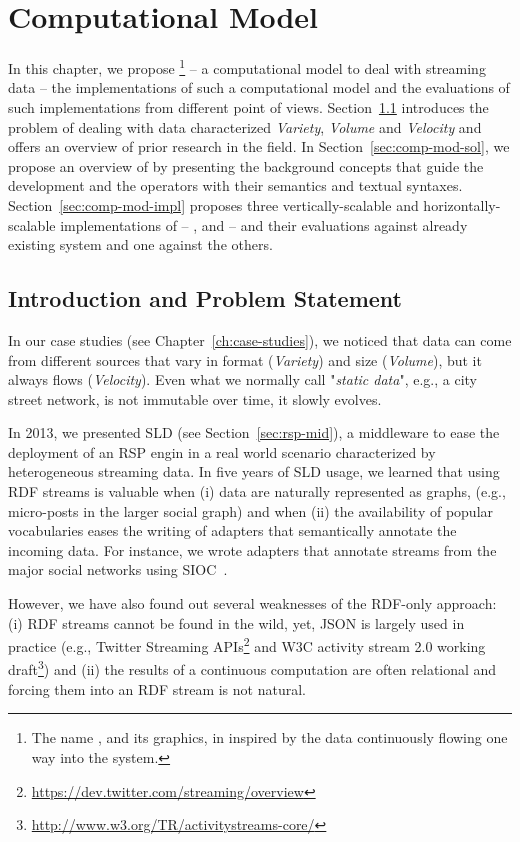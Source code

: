 \chapter{Computational Model}\label{ch:computational}
In this chapter, we propose \river{}\footnote{The name \river, and its graphics, in inspired by the data continuously flowing one way into the system.} -- a computational model to deal with streaming data -- the implementations of such a computational model and the evaluations of such implementations from different point of views.
Section~\ref{sec:comp-mod-intro} introduces the problem of dealing with data characterized \textit{Variety}, \textit{Volume} and \textit{Velocity} and offers an overview of prior research in the field.
In Section~\ref{sec:comp-mod-sol}, we propose an overview of \river{} by presenting the background concepts that guide the development and the operators with their semantics and textual syntaxes.
Section~\ref{sec:comp-mod-impl} proposes three vertically-scalable and horizontally-scalable implementations of \river{} -- \sti{}, \sparkdi{} and \hivedi{} -- and their evaluations against already existing system and one against the others.

\section{Introduction and Problem Statement} \label{sec:comp-mod-intro}
In our case studies (see Chapter~\ref{ch:case-studies}), we noticed that data can come from different sources that vary in format (\textit{Variety}) and size (\textit{Volume}), but it  always flows (\textit{Velocity}). Even what we normally call "\textit{static data}", e.g.,  a city street network, is not immutable over time, it  slowly evolves.

In 2013, we presented SLD (see Section~\ref{sec:rsp-mid}), a middleware to ease the deployment of an RSP engin in a real world scenario characterized by heterogeneous streaming data.
In five years of SLD usage, we learned that using RDF streams is valuable when (i) data are naturally represented as graphs, (e.g., micro-posts in the larger social graph) and when (ii) the availability of popular vocabularies eases the writing of adapters that semantically annotate the incoming data.
For instance, we wrote adapters that annotate streams from the major social networks using SIOC~\cite{DBLP:journals/ijwbc/BreslinDHB06}.

However, we have also found out several weaknesses of the RDF-only approach: (i) RDF streams cannot be found in the wild, yet, JSON is largely used in practice (e.g., Twitter Streaming APIs\footnote{\url{https://dev.twitter.com/streaming/overview}} and W3C activity stream 2.0 working draft\footnote{\url{http://www.w3.org/TR/activitystreams-core/}}) and (ii) the results of a continuous computation are often relational and forcing them into an RDF stream is not natural.

